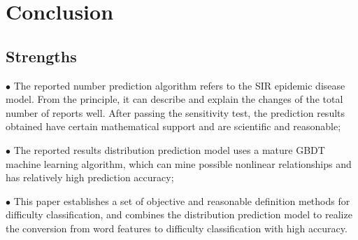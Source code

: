 \documentclass[
  journal=medium,
  manuscript=Report,
  year=2023,
  volume=37,
]{cup-journal}
\begin{document}
\begin{figure}[!htbp]
    \centering
    \hfill
    \label{combine7}
\end{figure}

\section{Conclusion}
\subsection{Strengths}
$\bullet$ The reported number prediction algorithm refers to the SIR epidemic disease model. From the principle, it can describe and explain the changes of the total number of reports well. After passing the sensitivity test, the prediction results obtained have certain mathematical support and are scientific and reasonable;

$\bullet$ The reported results distribution prediction model uses a mature GBDT machine learning algorithm, which can mine possible nonlinear relationships and has relatively high prediction accuracy;

$\bullet$ This paper establishes a set of objective and reasonable definition methods for difficulty classification, and combines the distribution prediction model to realize the conversion from word features to difficulty classification with high accuracy. 
\end{document}
